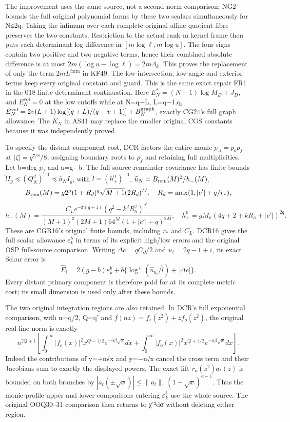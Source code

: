 \documentclass[11pt]{article}
\begin{document}
The improvement uses the same source, not a second norm comparison: NG2 bounds the full original polynomial forms by these two scalars simultaneously for N≤2q. Taking the infimum over each complete original affine quotient fibre preserves the two constants. Restriction to the actual rank-m kernel frame then puts each determinant log difference in \([m\log\ell,m\log u]\). The four signs contain two positive and two negative terms, hence their combined absolute difference is at most \(2m(\log u-\log\ell)=2m\Lambda_k\). This proves the replacement of only the term \(2mL^{\mathrm{form}}\) in KF49. The low-intersection, low-angle and exterior terms keep every original constant and guard. This is the same exact repair FR1 in the 018 finite determinant continuation. Here \(E_N^*=(N+1)\log M_D+J_D\), and \(E_N^{\mathrm{vol}}=0\) at the low cutoffs while at N=q+L, L=q−1,q, \(E_N^{\rm vol}=2v(L+1)\log[(q+L)/(q-v+1)]+B_N^{\rm graph}\), exactly CG24's full graph allowance. The \(K_N\) in AS41 may replace the smaller original CGS constants because it was independently proved.

To specify the distant-component cost, DCR factors the entire monic \(p_A=p_bp_f\) at \(|\zeta|=q^{7/8}/8\), assigning boundary roots to \(p_f\) and retaining full multiplicities. Let b=deg \(p_f\) and a=g−b. The full source remainder covariance has finite bounds \(\widehat lI_g\preceq(Q_N^d)^{-1}\preceq\widehat u_NI_g\), with \(\widehat l=(h_+^0)^{-1}\), \(\widehat u_N=B_{\rm rem}(M)^2/h_-(M)\), \[
B_{\rm rem}(M)=g2^g(1+R_d)^g\sqrt{M+1}(2R_d)^M,
\quad R_d=\max(1,|c'|+q/r_*),
\] \[
h_-(M)=\frac{C_Le^{-\pi(q+1)}(q^2-k^2R_h^2)^{q'}}
{(M+1)^2(2M+1)64^M(1+|c'|+q)^{2M}},
\quad h_+^0=gM_\sigma(4q+2+kR_h+|c'|)^{2q}.
\] These are CGR16's original finite bounds, including \(r_*\) and \(C_L\). DCR16 gives the full scalar allowance \(\varepsilon_k^b\) in terms of its explicit high/low errors and the original OSP full-source comparison. Writing \(\Delta c=qC_\partial/2\) and \(u_i=2q-1+i\), its exact Schur error is \[
\widehat E_i=2(g-b)\varepsilon_k^b+
b\{\log^+(\widehat u_{u_i}/\widehat l)+|\Delta c|\}.
\tag{AS49}
\] Every distant primary component is therefore paid for at its complete metric cost; its small dimension is used only after these bounds.

The two original integration regions are also retained. In DCR's full exponential comparison, with n=q/2, Q=q' and \(f(nz)=f_e(z^2)+zf_o(z^2)\), the original real-line norm is exactly \[
n^{2Q+1}\left[
\int_0^\infty|f_e(x)|^2x^{Q-1/2}e^{-n\beta\sqrt x}dx
+\int_0^\infty|f_o(x)|^2x^{Q+1/2}e^{-n\beta\sqrt x}dx\right].
\tag{AS50}
\] Indeed the contributions of y=+n√x and y=−n√x cancel the cross term and their Jacobians sum to exactly the displayed powers. The exact lift \(r_n(z^2)a_t(z)\) is bounded on both branches by \(|a_t(\pm\sqrt x)|\le\|a_t\|_1(1+\sqrt x)^{a-1}\). Thus the monic-profile upper and lower comparisons entering \(\varepsilon_k^b\) use the whole source. The original OOQ30--31 comparison then returns to \textbar χ'\textbar²dσ without deleting either region.
\end{document}
